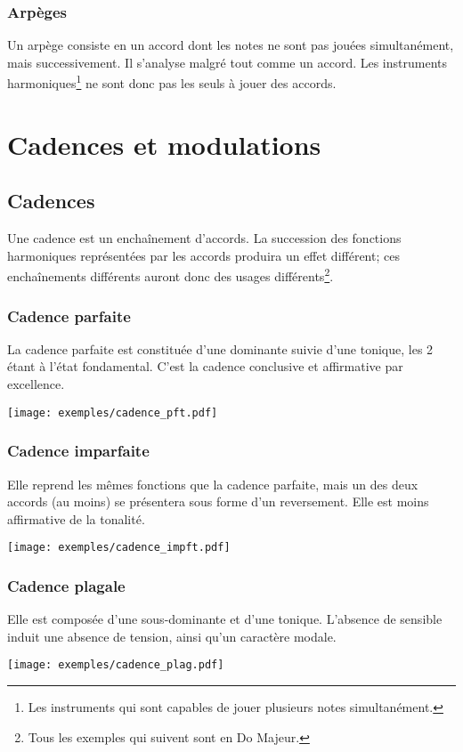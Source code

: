 \documentclass[11pt]{scrreprt}
\begin{document}
\subsection{Arpèges}
Un arpège consiste en un accord dont les notes ne sont pas jouées simultanément, mais successivement. Il s'analyse malgré tout comme un accord. Les instruments harmoniques\footnote{Les instruments qui sont capables de jouer plusieurs notes simultanément.} ne sont donc pas les seuls à jouer des accords.

\chapter{Cadences et modulations}
\section{Cadences}
Une cadence est un enchaînement d'accords. La succession des fonctions harmoniques représentées par les accords produira un effet différent; ces enchaînements différents auront donc des usages différents\footnote{Tous les exemples qui suivent sont en Do Majeur.}.
\subsection{Cadence parfaite}
La cadence parfaite est constituée d'une dominante suivie d'une tonique, les 2 étant à l'état fondamental. C'est la cadence conclusive et affirmative par excellence.
\begin{center}
  \texttt{[image: exemples/cadence\_pft.pdf]}
\end{center}
\subsection{Cadence imparfaite}
Elle reprend les mêmes fonctions que la cadence parfaite, mais un des deux accords (au moins) se présentera sous forme d'un reversement. Elle est moins affirmative de la tonalité.
\begin{center}
   \texttt{[image: exemples/cadence\_impft.pdf]}
\end{center}
\subsection{Cadence plagale}
Elle est composée d'une sous-dominante et d'une tonique. L'absence de sensible induit une absence de tension, ainsi qu'un caractère modale.
\begin{center}
   \texttt{[image: exemples/cadence\_plag.pdf]}
\end{center}
\end{document}
